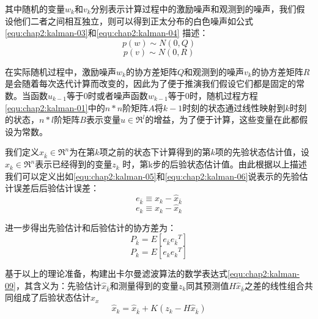 \par 其中随机的变量$w_{k}$和$v_{k}$分别表示计算过程中的激励噪声和观测到的噪声，我们假设他们二者之间相互独立，则可以得到正太分布的白色噪声如公式\ref{equ:chap2:kalman-03}和\ref{equ:chap2:kalman-04} 描述：
\begin{equation}
\label{equ:chap2:kalman-03}
  p(w)\sim N(0,Q)
\end{equation}
\begin{equation}
\label{equ:chap2:kalman-04}
  p(v)\sim N(0,R)
\end{equation}
\par 在实际随机过程中，激励噪声$w_{k}$的协方差矩阵$Q$和观测到的噪声$v_{k}$的协方差矩阵$R$是会随着每次迭代计算而改变的，因此为了便于推演我们假设它们都是固定的常数。当函数$u_{k-1}$等于0时或者噪声函数$w_{k-1}$等于0时，随机过程方程\ref{equ:chap2:kalman-01}中的$n*n$阶矩阵$A$将$k-1$时刻的状态通过线性映射到$k$时刻的状态，$n*l$阶矩阵$B$表示变量$u\in \Re^{l}$的增益，为了便于计算，这些变量在此都假设为常数。
\par 我们定义$\hat{x}_{\bar{k}} \in \Re^{n}$为在第$k$项之前的状态下计算得到的第$k$项的先验状态估计值，设$\hat{x}_{k} \in \Re^{n}$表示已经得到的变量$z_{k}$ 时，第k步的后验状态估计值。由此根据以上描述我们可以定义出如\ref{equ:chap2:kalman-05}和\ref{equ:chap2:kalman-06}说表示的先验估计误差后后验估计误差：
\begin{equation}
\label{equ:chap2:kalman-05}
  e_{\bar{k}}\equiv x_{k}-\hat{x}_{\bar{k}}
\end{equation}
\begin{equation}
\label{equ:chap2:kalman-06}
  e_{k}\equiv x_{k}-\hat{x}_{k}
\end{equation}
\par 进一步得出先验估计和后验估计的协方差为：
\begin{equation}
\label{equ:chap2:kalman-07}
P_{\bar{k}}=E\left [ e_{\bar{k}} {e_{\bar{k}}}^{T}  \right ]
\end{equation}
\begin{equation}
\label{equ:chap2:kalman-08}
P_{k}=E\left [ e_{k} {e_{k}}^{T}  \right ]
\end{equation}
\par 基于以上的理论准备，构建出卡尔曼滤波算法的数学表达式\ref{equ:chap2:kalman-09}，其含义为：先验估计$\hat{x}_{\bar{k}}$和测量得到的变量$z_{k}$同其预测值$H\hat{x}_{\bar{k}}$之差的线性组合共同组成了后验状态估计$\hat{x}_{x}$
\begin{equation}
\label{equ:chap2:kalman-09}
\hat{x}_{k}=\hat{x}_{\bar{k}} + K(z_{k}-H\hat{x}_{\bar{k}})
\end{equation}
